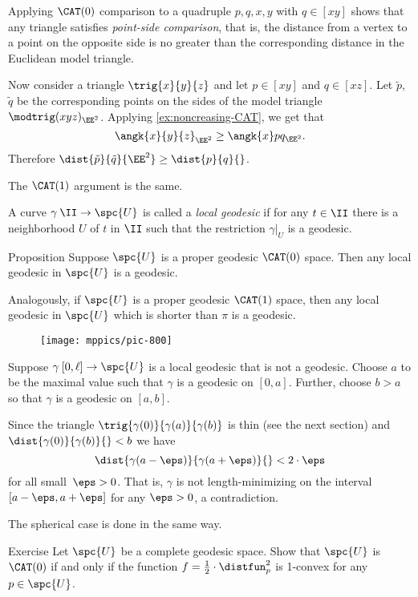 Applying $\CAT(0)$ comparison to a quadruple $p,q,x,y$ with $q\in [xy]$ shows that any triangle satisfies \emph{point-side comparison}, that is, the distance from a vertex to a  point on the opposite side is no greater than the corresponding distance in the Euclidean model triangle.  

Now consider a triangle $\trig{x}{y}{z}$ and let $p\in [xy]$ and $q\in [xz]$.
Let $\tilde p$, $\tilde q$ be the corresponding points on the sides of the model triangle $\modtrig({x}{y}{z})_{\EE^2}$.
Applying \ref{ex:noncreasing-CAT}, we get that
\[\angk {x} {y} {z}_{\EE^2} \ge \angk {x} p q _{\EE^2}.\]
Therefore $ \dist{\tilde p}{\tilde q}{\EE^2}\ge \dist{p}{q}{}$.

The $\CAT(1)$ argument is the same.
\qeds

A curve $\gamma\:\II\to \spc{U}$ is called a \emph{local geodesic} if for any $t\in\II$ there is a neighborhood $U$ of $t$ in $\II$ such that the restriction $\gamma|_U$ is a  geodesic.

\begin{thm}{Proposition}\label{cor:loc-geod-are-min}
Suppose $\spc{U}$ is a proper geodesic $\CAT(0)$ space.  
Then any local geodesic in $\spc{U}$ is a geodesic.

Analogously, if $\spc{U}$ is a proper geodesic $\CAT(1)$ space, then any local geodesic in $\spc{U}$ which is shorter than $\pi$ is a geodesic.
\end{thm}


\begin{wrapfigure}{r}{25mm}
\vskip-0mm
\centering
\texttt{[image: mppics/pic-800]}
\end{wrapfigure}

Suppose $\gamma\:[0,\ell]\to\spc{U}$ is a local geodesic that is not a geodesic.
Choose $a$ to be the maximal value 
such that $\gamma$ is a geodesic on $[0,a]$.
Further, choose $b>a$ so that $\gamma$ is a geodesic on $[a,b]$.

Since the triangle $\trig{\gamma(0)}{\gamma(a)}{\gamma(b)}$ is thin (see the next section) and 
$\dist{\gamma(0)}{\gamma(b)}{}<b$ we have
\[\dist{\gamma(a-\eps)}{\gamma(a+\eps)}{}<2\cdot\eps\]
for all small~$\eps>0$.
That is, $\gamma$ is not length-minimizing on the interval $[a-\eps,a+\eps]$ for any $\eps>0$,
a contradiction.

The spherical case is done in the same way.
\qeds

\begin{thm}{Exercise}\label{ex:convex-distfun}
Let $\spc{U}$ be a complete geodesic space.
Show that $\spc{U}$ is $\CAT(0)$ if and only if the function $f=\tfrac12\cdot\distfun_p^2$ is 1-convex for any $p\in \spc{U}$.
\end{thm}


